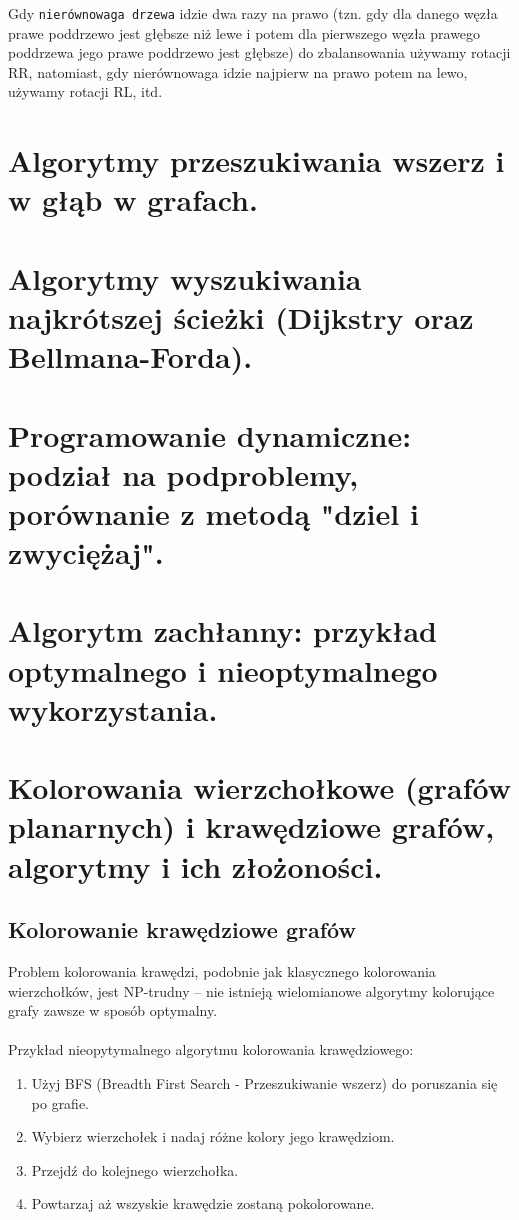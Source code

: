 \documentclass[12pt]{article}
\begin{document}
    \noindent Gdy \texttt{nierównowaga drzewa} idzie dwa razy na prawo (tzn. gdy dla danego węzła prawe poddrzewo jest głębsze niż lewe i potem dla pierwszego węzła prawego poddrzewa jego prawe poddrzewo jest głębsze) do zbalansowania używamy rotacji RR, natomiast, gdy nierównowaga idzie najpierw na prawo potem na lewo, używamy rotacji RL, itd.
    
    \section{Algorytmy przeszukiwania wszerz i w głąb w grafach.}
    \section{Algorytmy wyszukiwania najkrótszej ścieżki (Dijkstry oraz Bellmana-Forda).}
    \section{Programowanie dynamiczne: podział na podproblemy, porównanie z metodą "dziel i zwyciężaj".}
    \section{Algorytm zachłanny: przykład optymalnego i nieoptymalnego wykorzystania.}
    
    \newpage
    
    \section{Kolorowania wierzchołkowe (grafów planarnych) i krawędziowe grafów, algorytmy i ich złożoności.}
    
    \subsection{Kolorowanie krawędziowe grafów}
    Problem kolorowania krawędzi, podobnie jak klasycznego kolorowania wierzchołków, jest NP-trudny – nie istnieją wielomianowe algorytmy kolorujące grafy zawsze w sposób optymalny.
    \\\\
    Przykład nieopytymalnego algorytmu kolorowania krawędziowego:
    \begin{enumerate}
        \item Użyj BFS (Breadth First Search - Przeszukiwanie wszerz) do poruszania się po grafie.
        \item Wybierz wierzchołek i nadaj różne kolory jego krawędziom.
        \item Przejdź do kolejnego wierzchołka.
        \item Powtarzaj aż wszyskie krawędzie zostaną pokolorowane.
    \end{enumerate}
    
\end{document}
